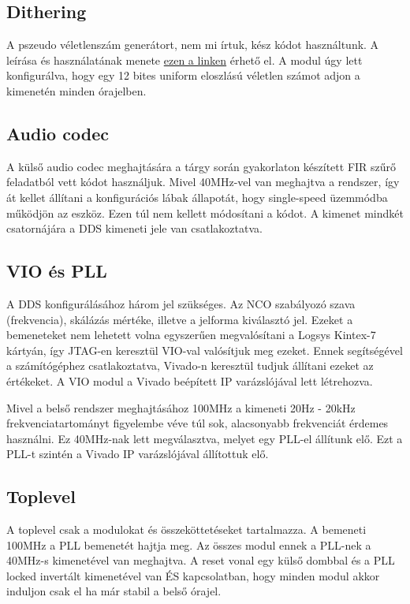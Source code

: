 \documentclass[a4paper,11pt]{article}
\begin{document}
\subsection{Dithering}

A pszeudo véletlenszám generátort, nem mi írtuk, kész kódot használtunk. A leírása és használatának menete \href{https://eewiki.net/pages/viewpage.action?pageId=16351401}{ezen a linken} érhető el. A modul úgy lett konfigurálva, hogy egy 12 bites uniform eloszlású véletlen számot adjon a kimenetén minden órajelben.

\subsection{Audio codec}

A külső audio codec meghajtására a tárgy során gyakorlaton készített FIR szűrő feladatból vett kódot használjuk. Mivel 40MHz-vel van meghajtva a rendszer, így át kellet állítani a konfigurációs lábak állapotát, hogy single-speed üzemmódba működjön az eszköz. Ezen túl nem kellett módosítani a kódot. A kimenet mindkét csatornájára a DDS kimeneti jele van csatlakoztatva.

\subsection{VIO és PLL}
A DDS konfigurálásához három jel szükséges. Az NCO szabályozó szava (frekvencia), skálázás mértéke, illetve a jelforma kiválasztó jel. Ezeket a bemeneteket nem lehetett volna egyszerűen megvalósítani a Logsys Kintex-7 kártyán, így JTAG-en keresztül VIO-val valósítjuk meg ezeket. Ennek segítségével a számítógéphez csatlakoztatva, Vivado-n keresztül tudjuk állítani ezeket az értékeket. A VIO modul a Vivado beépített IP varázslójával lett létrehozva.

Mivel a belső rendszer meghajtásához 100MHz a kimeneti 20Hz - 20kHz frekvenciatartományt figyelembe véve túl sok, alacsonyabb frekvenciát érdemes használni. Ez 40MHz-nak lett megválasztva, melyet egy PLL-el állítunk elő. Ezt a PLL-t szintén a Vivado IP varázslójával állítottuk elő.

\subsection{Toplevel}

A toplevel csak a modulokat és összeköttetéseket tartalmazza. A bemeneti 100MHz a PLL bemenetét hajtja meg. Az összes modul ennek a PLL-nek a 40MHz-s kimenetével van meghajtva. A reset vonal egy külső dombbal és a PLL locked invertált kimenetével van ÉS kapcsolatban, hogy minden modul akkor induljon csak el ha már stabil a belső órajel.
\end{document}
